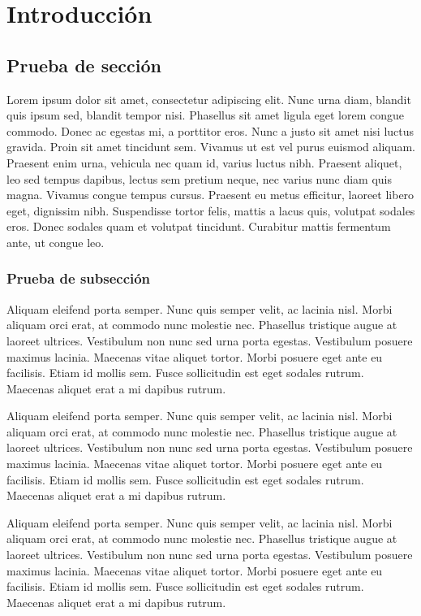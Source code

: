 \chapter{Introducción}

\section{Prueba de sección}

Lorem ipsum dolor sit amet, consectetur adipiscing elit. Nunc urna diam, blandit quis ipsum sed, blandit tempor nisi. Phasellus sit amet ligula eget lorem congue commodo. Donec ac egestas mi, a porttitor eros. Nunc a justo sit amet nisi luctus gravida. Proin sit amet tincidunt sem. Vivamus ut est vel purus euismod aliquam. Praesent enim urna, vehicula nec quam id, varius luctus nibh. Praesent aliquet, leo sed tempus dapibus, lectus sem pretium neque, nec varius nunc diam quis magna. Vivamus congue tempus cursus. Praesent eu metus efficitur, laoreet libero eget, dignissim nibh. Suspendisse tortor felis, mattis a lacus quis, volutpat sodales eros. Donec sodales quam et volutpat tincidunt. Curabitur mattis fermentum ante, ut congue leo.

\subsection{Prueba de subsección}

Aliquam eleifend porta semper. Nunc quis semper velit, ac lacinia nisl. Morbi aliquam orci erat, at commodo nunc molestie nec. Phasellus tristique augue at laoreet ultrices. Vestibulum non nunc sed urna porta egestas. Vestibulum posuere maximus lacinia. Maecenas vitae aliquet tortor. Morbi posuere eget ante eu facilisis. Etiam id mollis sem. Fusce sollicitudin est eget sodales rutrum. Maecenas aliquet erat a mi dapibus rutrum.

Aliquam eleifend porta semper. Nunc quis semper velit, ac lacinia nisl. Morbi aliquam orci erat, at commodo nunc molestie nec. Phasellus tristique augue at laoreet ultrices. Vestibulum non nunc sed urna porta egestas. Vestibulum posuere maximus lacinia. Maecenas vitae aliquet tortor. Morbi posuere eget ante eu facilisis. Etiam id mollis sem. Fusce sollicitudin est eget sodales rutrum. Maecenas aliquet erat a mi dapibus rutrum.

Aliquam eleifend porta semper. Nunc quis semper velit, ac lacinia nisl. Morbi aliquam orci erat, at commodo nunc molestie nec. Phasellus tristique augue at laoreet ultrices. Vestibulum non nunc sed urna porta egestas. Vestibulum posuere maximus lacinia. Maecenas vitae aliquet tortor. Morbi posuere eget ante eu facilisis. Etiam id mollis sem. Fusce sollicitudin est eget sodales rutrum. Maecenas aliquet erat a mi dapibus rutrum.

